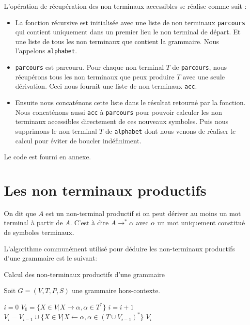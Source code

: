 \documentclass[11pt,a4paper]{article}
\def\code#1{\texttt{#1}} %
\begin{document}
L'opération de récupération des non terminaux accessibles se réalise
comme suit : 

\begin{itemize}
    \item La fonction récursive est initialisée avec une liste
    de non terminaux \code{parcours} qui contient uniquement
    dans un premier lieu le non terminal de départ.
    Et une liste de tous les non terminaux que contient 
    la grammaire. Nous l'appelons \code{alphabet}.
    \item \code{parcours} est parcouru. Pour chaque non terminal $T$
    de \code{parcours}, nous récupérons tous les non terminaux
    que peux produire $T$ avec une seule dérivation. Ceci nous fournit
    une liste de non terminaux \code{acc}.
    \item Ensuite nous concaténons cette liste dans le résultat 
    retourné par la fonction. Nous concaténons aussi \code{acc}
    à \code{parcours} pour pouvoir calculer les non terminaux
    accessibles directement de ces nouveaux symboles. 
    Puis nous supprimons le non terminal $T$ de \code{alphabet} 
    dont nous venons de réaliser le calcul pour éviter de boucler indéfiniment.
\end{itemize}

Le code est fourni en annexe.

\newpage


\section{Les non terminaux productifs}

On dit que $A$ est un non-terminal productif si on peut dériver au moins un mot terminal à partir de $A$. C'est à dire $A \rightarrow^* \alpha$ avec $\alpha$ un mot uniquement constitué de symboles terminaux.
\newline

L'algorithme communément utilisé pour déduire les non-terminaux productifs d'une grammaire est le suivant:
\begin{algorithm}
\caption{Calcul des non-terminaux productifs d'une grammaire}
Soit $G=(V,T,P,S)$ une grammaire hors-contexte.
\begin{algorithmic}
\STATE $i = 0$
\STATE $V_0 = \{X \in V | X \rightarrow \alpha, \alpha \in T^*\}$
\REPEAT
\STATE $i=i+1$
\STATE $V_i = V_{i-1} \cup \{X \in V | X \leftarrow \alpha, \alpha \in (T \cup V_{i-1})^*\}$
\RETURN $V_i$
\end{algorithmic}
\end{algorithm}
\newline
\end{document}
